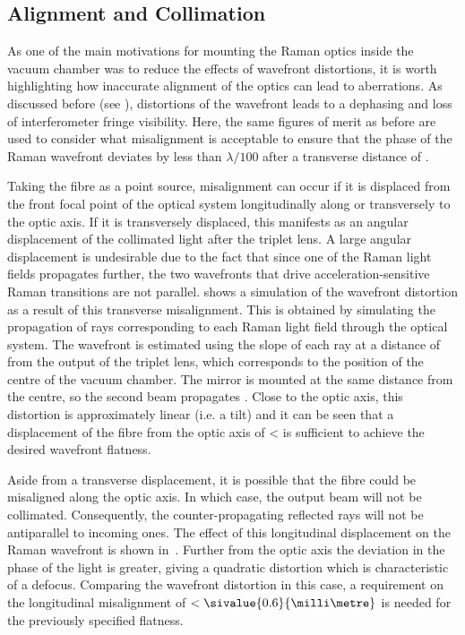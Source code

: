 \subsection{Alignment and Collimation}
As one of the main motivations for mounting the Raman optics inside the vacuum
chamber was to reduce the effects of wavefront distortions, it is worth
highlighting how inaccurate alignment of the optics can lead to aberrations. As
discussed before (see ), distortions of the
wavefront leads to a dephasing and loss of interferometer fringe visibility.
Here, the same figures of merit as before are used to consider what misalignment
is acceptable to ensure that the phase of the Raman wavefront deviates by less
than \(\lambda/100\) after a transverse distance of
. \par\noindent Taking the fibre as a point source,
misalignment can occur if it is displaced from the front focal point of the
optical system longitudinally along or transversely to the optic axis. If it is
transversely displaced, this manifests as an angular displacement of the
collimated light after the triplet lens. A large angular displacement is
undesirable due to the fact that since one of the Raman light fields propagates
further, the two wavefronts that drive acceleration-sensitive Raman transitions
are not parallel.  shows a simulation of
the wavefront distortion as a result of this transverse misalignment. This is
obtained by simulating the propagation of rays corresponding to each Raman light
field through the optical system. The wavefront is estimated using the slope of
each ray at a distance of  from the output of the
triplet lens, which corresponds to the position of the centre of the vacuum
chamber. The mirror is mounted at the same distance from the centre, so the
second beam propagates . Close to the optic axis,
this distortion is approximately linear (i.e. a tilt) and it can be seen that a
displacement of the fibre from the optic axis of < is
sufficient to achieve the desired wavefront flatness. \par\noindent Aside from a
transverse displacement, it is possible that the fibre could be misaligned along
the optic axis. In which case, the output beam will not be collimated.
Consequently, the counter-propagating reflected rays will not be antiparallel to
incoming ones. The effect of this longitudinal displacement on the Raman
wavefront is shown in~. Further from the
optic axis the deviation in the phase of the light is greater, giving a
quadratic distortion which is characteristic of a defocus. Comparing the
wavefront distortion in this case, a requirement on the longitudinal
misalignment of \(< \sivalue{0.6}{\milli\metre}\) is needed for the previously
specified flatness.

